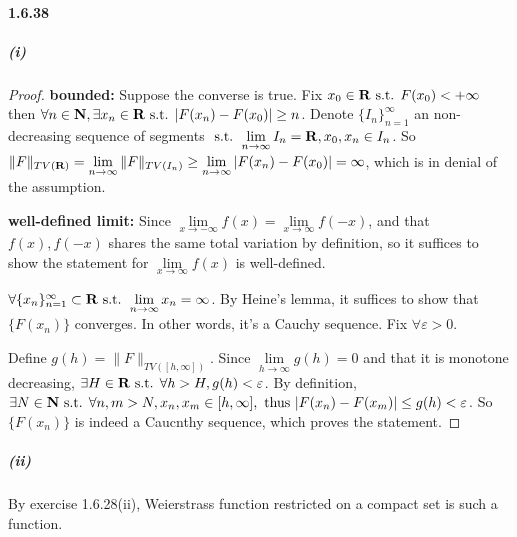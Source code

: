 \documentclass{article}
\begin{document}
\paragraph{1.6.38}
\subparagraph{(i)}
\begin{proof}
\textbf{bounded:} Suppose the converse is true. Fix $x_0\in \mathbf{R}\text{ s.t. } F(x_0)<+\infty$ then $\forall n\in\mathbf{N},\exists x_n\in\mathbf{R}\text{ s.t. } |F(x_n)-F(x_0)|\geq n$. Denote $\{I_n\}_{n=1}^\infty$ an non-decreasing sequence of segments $\text{ s.t. } \lim\limits_{n\to\infty}I_n=\mathbf{R}, x_0,x_n\in I_n$. So $\|F\|_{TV(\mathbf{R})}=\lim\limits_{n\to\infty}\|F\|_{TV(I_n)}\geq \lim\limits_{n\to\infty}|F(x_n)-F(x_0)|=\infty$, which is in denial of the assumption.

\textbf{well-defined limit:} Since $\lim\limits_{x\to-\infty}f(x)=\lim\limits_{x\to\infty}f(-x)$, and that $f(x),f(-x)$ shares the same total variation by definition, so it suffices to show the statement for $\lim\limits_{x\to\infty}f(x)$ is well-defined.

$\forall\{x_n\}_{n=1}^\infty\subset\mathbf{R}\text{ s.t. }\lim\limits_{n\to\infty}x_n=\infty$. By Heine's lemma, it suffices to show that $\{F(x_n)\}$ converges. In other words, it's a Cauchy sequence. Fix $\forall \varepsilon>0$.

Define $g(h)=\|F\|_{TV([h,\infty])}$. Since $\lim\limits_{h\to\infty}g(h)=0$ and that it is monotone decreasing, $\exists H\in \mathbf{R}\text{ s.t. } \forall h>H, g(h)<\varepsilon$. By definition, $\exists N\in\mathbf{N}\text{ s.t. }\forall n,m>N, x_n,x_m\in [h,\infty], \text{ thus } |F(x_n)-F(x_m)|\leq g(h)<\varepsilon$. So $\{F(x_n)\}$ is indeed a Caucnthy sequence, which proves the statement.

\end{proof}
\subparagraph{(ii)}
By exercise 1.6.28(ii), Weierstrass function restricted on a compact set is such a function.
\end{document}
